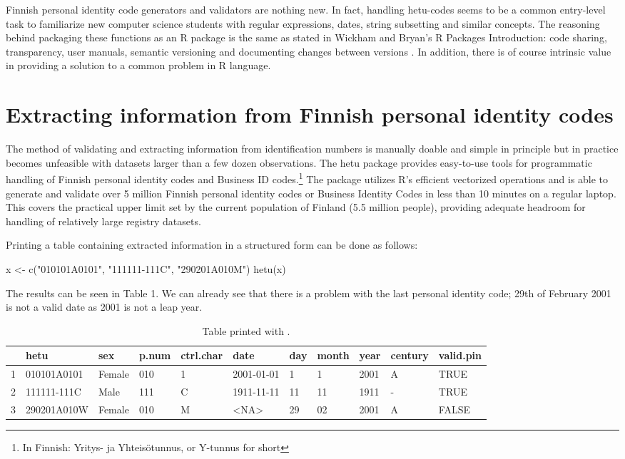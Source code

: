 Finnish personal identity code generators and validators are nothing new. In fact, handling hetu-codes seems to be a common entry-level task to familiarize new computer science students with regular expressions, dates, string subsetting and similar concepts. The reasoning behind packaging these functions as an R package is the same as stated in Wickham and Bryan's R Packages Introduction: code sharing, transparency, user manuals, semantic versioning and documenting changes between versions \citep{wickham}. In addition, there is of course intrinsic value in providing a solution to a common problem in R language.

\section{Extracting information from Finnish personal identity codes}

The method of validating and extracting information from identification numbers is manually doable and simple in principle but in practice becomes unfeasible with datasets larger than a few dozen observations. The hetu package provides easy-to-use tools for programmatic handling of Finnish personal identity codes and Business ID codes.\footnote{In Finnish: Yritys- ja Yhteisötunnus, or Y-tunnus for short} The package utilizes R’s efficient vectorized operations and is able to generate and validate over 5 million Finnish personal identity codes or Business Identity Codes in less than 10 minutes on a regular laptop. This covers the practical upper limit set by the current population of Finland (5.5 million people), providing adequate headroom for handling of relatively large registry datasets.

Printing a table containing extracted information in a structured form can be done as follows:

\begin{example}
  x <- c("010101A0101", "111111-111C", "290201A010M")
  hetu(x)
\end{example}

The results can be seen in Table 1. We can already see that there is a problem with the last personal identity code; 29th of February 2001 is not a valid date as 2001 is not a leap year.

\begin{table}[ht]
\centering
\begin{tabular}{rllllllllll}
\toprule
    & hetu & sex & p.num & ctrl.char & date & day & month & year & century & valid.pin \\ 
  \hline
  1 & 010101A0101 & Female & 010 & 1 & 2001-01-01 & 1 & 1 & 2001 & A & TRUE \\ 
  2 & 111111-111C & Male & 111 & C &  1911-11-11 & 11 & 11 & 1911 & - & TRUE \\
  3 & 290201A010W & Female & 010 & M & <NA> & 29 & 02 & 2001 & A & FALSE \\
\bottomrule   
\end{tabular}
\caption{Table printed with .}
\label{tab:hetuprintout}
\end{table}


